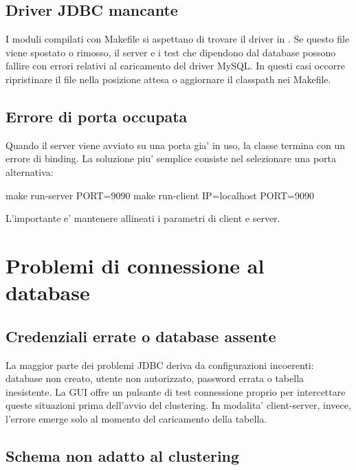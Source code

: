 \subsection{Driver JDBC mancante}

I moduli compilati con Makefile si aspettano di trovare il driver in
. Se questo file viene spostato o
rimosso, il server e i test che dipendono dal database possono fallire con errori
relativi al caricamento del driver MySQL. In questi casi occorre ripristinare il file
nella posizione attesa o aggiornare il classpath nei Makefile.

\subsection{Errore di porta occupata}

Quando il server viene avviato su una porta gia' in uso, la classe 
termina con un errore di binding. La soluzione piu' semplice consiste nel selezionare una
porta alternativa:

\begin{commandblock}
  make run-server PORT=9090
  make run-client IP=localhost PORT=9090
\end{commandblock}

L'importante e' mantenere allineati i parametri di client e server.

\section{Problemi di connessione al database}

\subsection{Credenziali errate o database assente}

La maggior parte dei problemi JDBC deriva da configurazioni incoerenti: database non
creato, utente non autorizzato, password errata o tabella inesistente. La GUI offre un
pulsante di test connessione proprio per intercettare queste situazioni prima dell'avvio
del clustering. In modalita' client-server, invece, l'errore emerge solo al momento del
caricamento della tabella.

\subsection{Schema non adatto al clustering}

